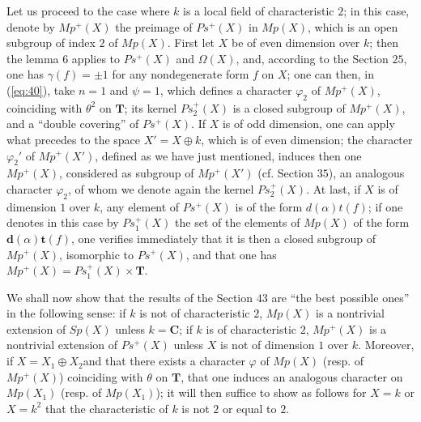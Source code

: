 \documentclass[12pt]{amsart}
\newcounter{ssection}
\renewcommand{\subsection}{
  \addtocounter{ssection}{1}{\bf  \arabic{ssection}.\  }}
\begin{document}
Let us proceed to the case where $k$ is a local field of characteristic
$2$; in this case, denote by $Mp^{+}(X)$ the preimage of $Ps^{+}(X)$
in $Mp(X)$, which is an open subgroup of index $2$ of $Mp(X)$.
First let $X$ be of even dimension over $k$; then the lemma $6$
applies to $Ps^{+}(X)$ and $\Omega(X)$, and, according to the Section
$25$, one has $\gamma(f)=\pm1$ for any nondegenerate form $f$ on
$X$; one can then, in (\ref{eq:40}), take $n=1$ and $\psi=1$, which defines
a character $\varphi_{2}$ of $Mp^{+}(X)$, coinciding with $\theta^{2}$
on $\mathbf{T}$; its kernel $Ps_{2}^{+}(X)$ is a closed subgroup
of $Mp^{+}(X)$, and a {}``double covering'' of $Ps^{+}(X)$. If
$X$ is of odd dimension, one can apply what precedes to the space
$X'=X\oplus k$, which is of even dimension; the character $\varphi_{2}'$
of $Mp^{+}(X')$, defined as we have just mentioned, induces then
one $Mp^{+}(X)$, considered as subgroup of $Mp^{+}(X')$ (cf. Section
$35$), an analogous character $\varphi_{2}$, of whom we denote again
the kernel $Ps_{2}^{+}(X)$. At last, if $X$ is of dimension $1$
over $k$, any element of $Ps^{+}(X)$ is of the form $d(\alpha)t(f)$;
if one denotes in this case by $Ps_{1}^{+}(X)$ the set of the elements
of $Mp(X)$ of the form $\mathbf{d}(\alpha)\mathbf{t}(f)$, one verifies
immediately that it is then a closed subgroup of $Mp^{+}(X)$, isomorphic
to $Ps^{+}(X)$, and that one has $Mp^{+}(X)=Ps_{1}^{+}(X)\times\mathbf{T}$.

\subsection{}
We shall now show that the results of the Section $43$ are {}``the
best possible ones'' in the following sense: if $k$ is not of characteristic
$2$, $Mp(X)$ is a nontrivial extension of $Sp(X)$ unless $k=\mathbf{C}$;
if $k$ is of characteristic $2$, $Mp^{+}(X)$ is a nontrivial extension
of $Ps^{+}(X)$ unless $X$ is not of dimension $1$ over $k$. Moreover,
if $X=X_{1}\oplus X_{2}$and that there exists a character $\varphi$
of $Mp(X)$ (resp. of $Mp^{+}(X)$) coinciding with $\theta$ on $\mathbf{T}$,
that one induces an analogous character on $Mp(X_{1})$ (resp. of
$Mp(X_{1})$); it will then suffice to show as follows for $X=k$
or $X=k^{2}$ that the characteristic of $k$ is not $2$ or equal
to $2$.
\end{document}
